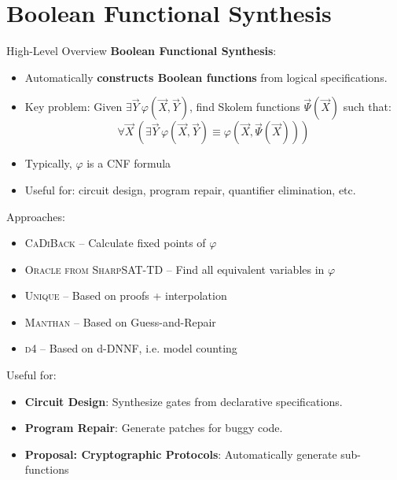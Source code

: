 \documentclass[aspectratio=169]{beamer}
\begin{document}
\section{Boolean Functional Synthesis}
\begin{frame}{High-Level Overview}
  \textbf{Boolean Functional Synthesis}:
  \begin{itemize}
    \item Automatically \textbf{constructs Boolean functions} from logical specifications.
    \item Key problem: Given \(\exists \vec{Y}\, \varphi(\vec{X}, \vec{Y})\),
        find Skolem functions \(\vec{\Psi}(\vec{X})\) such that:
        \[
            \forall \vec{X}\, \left( \exists \vec{Y}\, \varphi(\vec{X}, \vec{Y}) \equiv \varphi(\vec{X}, \vec{\Psi}(\vec{X})) \right)
        \]
    \item Typically, \(\varphi\) is a CNF formula
    \item Useful for: circuit design, program repair, quantifier elimination, etc.
\end{itemize}
\bigskip

Approaches:
\begin{itemize}
    \item \textsc{CaDiBack} -- Calculate fixed points of \(\varphi\)
    \item \textsc{Oracle from SharpSAT-TD} -- Find all equivalent variables in \(\varphi\)
    \item \textsc{Unique} -- Based on proofs + interpolation
    \item \textsc{Manthan} -- Based on Guess-and-Repair
    \item \textsc{d4} -- Based on d-DNNF, i.e. model counting
\end{itemize}
\bigskip

Useful for:
\begin{itemize}
    \item \textbf{Circuit Design}: Synthesize gates from declarative specifications.
    \item \textbf{Program Repair}: Generate patches for buggy code.
    \item \textbf{Proposal: Cryptographic Protocols}: Automatically generate sub-functions
\end{itemize}
\end{frame}
\end{document}
